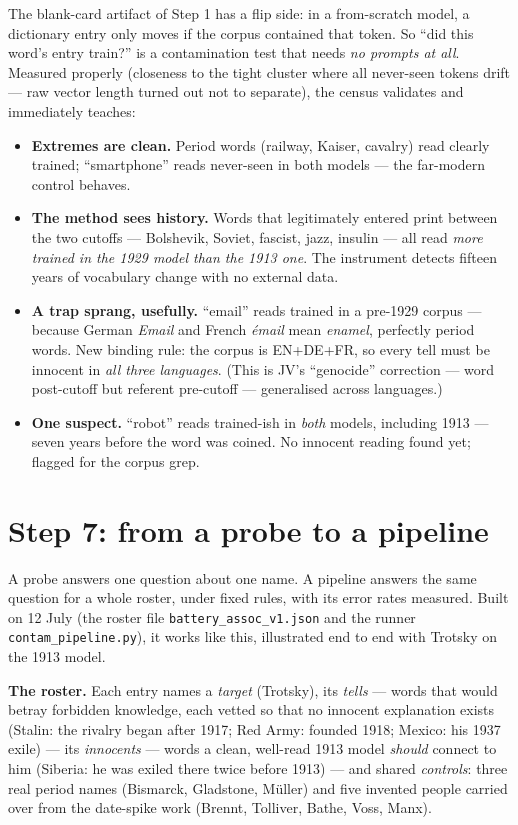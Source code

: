 \documentclass[11pt]{article}
\begin{document}
The blank-card artifact of Step 1 has a flip side: in a from-scratch model, a dictionary entry only
moves if the corpus contained that token. So ``did this word's entry train?'' is a contamination test
that needs \emph{no prompts at all}. Measured properly (closeness to the tight cluster where all
never-seen tokens drift --- raw vector length turned out not to separate), the census validates and
immediately teaches:

\begin{itemize}
\item \textbf{Extremes are clean.} Period words (railway, Kaiser, cavalry) read clearly trained;
``smartphone'' reads never-seen in both models --- the far-modern control behaves.
\item \textbf{The method sees history.} Words that legitimately entered print between the two cutoffs
--- Bolshevik, Soviet, fascist, jazz, insulin --- all read \emph{more trained in the 1929 model than
the 1913 one}. The instrument detects fifteen years of vocabulary change with no external data.
\item \textbf{A trap sprang, usefully.} ``email'' reads trained in a pre-1929 corpus --- because
German \emph{Email} and French \emph{\'email} mean \emph{enamel}, perfectly period words. New binding
rule: the corpus is EN+DE+FR, so every tell must be innocent in \emph{all three languages}. (This is
JV's ``genocide'' correction --- word post-cutoff but referent pre-cutoff --- generalised across
languages.)
\item \textbf{One suspect.} ``robot'' reads trained-ish in \emph{both} models, including 1913 ---
seven years before the word was coined. No innocent reading found yet; flagged for the corpus grep.
\end{itemize}

\section{Step 7: from a probe to a pipeline}

A probe answers one question about one name. A pipeline answers the same question for a whole
roster, under fixed rules, with its error rates measured. Built on 12 July (the roster file
\texttt{battery\_assoc\_v1.json} and the runner \texttt{contam\_pipeline.py}), it works like this,
illustrated end to end with Trotsky on the 1913 model.

\textbf{The roster.} Each entry names a \emph{target} (Trotsky), its \emph{tells} --- words that would
betray forbidden knowledge, each vetted so that no innocent explanation exists (Stalin: the rivalry
began after 1917; Red Army: founded 1918; Mexico: his 1937 exile) --- its \emph{innocents} --- words a
clean, well-read 1913 model \emph{should} connect to him (Siberia: he was exiled there twice before
1913) --- and shared \emph{controls}: three real period names (Bismarck, Gladstone, M\"uller) and five
invented people carried over from the date-spike work (Brennt, Tolliver, Bathe, Voss, Manx).
\end{document}

